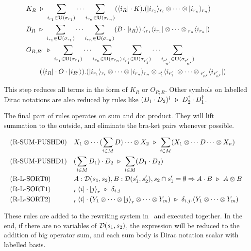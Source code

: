 \begin{align*}
    & K_R \ \triangleright\ \sum_{i_{r_1}\in\mathbf{U}(\sigma_{r_1})}\cdots \sum_{i_{r_n}\in\mathbf{U}(\sigma_{r_n})} (\langle i_R|\cdot K). (|i_{r_1}\rangle_{r_i}\otimes\cdots\otimes|i_{r_n}\rangle_{r_n}) \\
    & B_R \ \triangleright\ \sum_{i_{r_1}\in\mathbf{U}(\sigma_{r_1})}\cdots \sum_{i_{r_n}\in\mathbf{U}(\sigma_{r_n})} (B\cdot |i_R\rangle). ({}_{r_1}\langle i_{r_1}|\otimes\cdots\otimes{}_{r_n}\langle i_{r_n}|) \\
    & O_{R,R'} \ \triangleright\ \sum_{i_{r_1}\in\mathbf{U}(\sigma_{r_1})}\cdots \sum_{i_{r_n}\in\mathbf{U}(\sigma_{r_n})}
    \sum_{i_{r'_1}\in\mathbf{U}(\sigma_{r'_1})}\cdots \sum_{i_{r'_{n'}}\in\mathbf{U}(\sigma_{r'_{n'}})} \\
    & \qquad (\langle i_R|\cdot O\cdot |i_{R'}\rangle).(|i_{r_1}\rangle_{r_i}\otimes\cdots\otimes|i_{r_n}\rangle_{r_n} \otimes {}_{r'_1}\langle i_{r'_1}|\otimes\cdots\otimes{}_{r'_{n'}}\langle i_{r'_{n'}}|)
\end{align*}

This step reduces all terms in the form of $K_R$ or $O_{R;R}$.
Other symbols on labelled Dirac notations are also reduced by rules like $(D_1 \cdot D_2)^\dagger \ \triangleright\ D_2^\dagger \cdot D_1^\dagger$.

The final part of rules operates on sum and dot product. They will lift summation to the outside, and eliminate the bra-ket pairs whenever possible.

\begin{align*}
    & \textrm{(R-SUM-PUSHD0)}
    && X_1 \otimes \cdots (\sum_{i \in M} D) \cdots \otimes X_2\ \triangleright\ \sum_{i \in M} (X_1 \otimes \cdots D \cdots \otimes X_n) \\
    & \textrm{(R-SUM-PUSHD1)}
    && (\sum_{i \in M} D_1) \cdot D_2 \ \triangleright\ \sum_{i \in M} (D_1 \cdot D_2) \\
    & \textrm{(R-L-SORT0)}
    && A : \mathcal{D}(s_1, s_2), B : \mathcal{D}(s_1', s_2'), s_2 \cap s_1'=\emptyset \Rightarrow A \cdot B \ \triangleright\ A \otimes B \\
    & \textrm{(R-L-SORT1)}
    && {}_r\bra{i}\cdot\ket{j}_r \ \triangleright\ \delta_{i, j} \\
    & \textrm{(R-L-SORT2)}
    && {}_r\bra{i}\cdot(Y_1 \otimes \cdots \otimes \ket{j}_r \otimes \cdots \otimes Y_m) \ \triangleright\ \delta_{i, j}.(Y_1  \otimes \cdots \otimes Y_m) \\
\end{align*}

These rules are added to the rewriting system in~ and executed together.
In the end, if there are no variables of $\mathcal{D}(s_1, s_2)$, the expression will be reduced to the addition of big operator sum, and each sum body is Dirac notation scalar with labelled basis.

